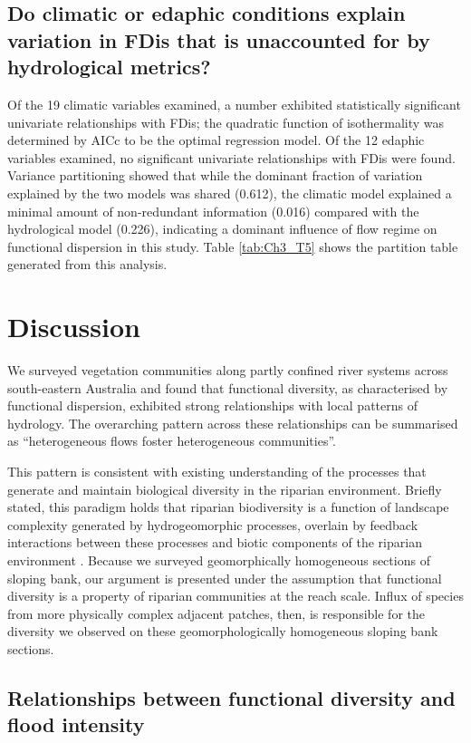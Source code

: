 \documentclass[openright,12pt,a4paper]{memoir}
\begin{document}
\subsection{Do climatic or edaphic conditions explain variation in FDis that is unaccounted for by hydrological metrics?}
Of the 19 climatic variables examined, a number exhibited statistically significant univariate relationships with FDis; the quadratic function of isothermality was determined by AICc to be the optimal regression model. Of the 12 edaphic variables examined, no significant univariate relationships with FDis were found.  Variance partitioning showed that while the dominant fraction of variation explained by the two models was shared (0.612), the climatic model explained a minimal amount of non-redundant information (0.016) compared with the hydrological model (0.226), indicating a dominant influence of flow regime on functional dispersion in this study. Table \ref{tab:Ch3_T5} shows the partition table generated from this analysis.



\section{Discussion}
We surveyed vegetation communities along partly confined river systems across south-eastern Australia and found that functional diversity, as characterised by functional dispersion, exhibited strong relationships with local patterns of hydrology. The overarching pattern across these relationships can be summarised as “heterogeneous flows foster heterogeneous communities”.

This pattern is consistent with existing understanding of the processes that generate and maintain biological diversity in the riparian environment. Briefly stated, this paradigm holds that riparian biodiversity is a function of landscape complexity generated by hydrogeomorphic processes, overlain by feedback interactions between these processes and biotic components of the riparian environment \citep{Tabacchi1998, Palmer1997, Corenblit2007, Bornette2008}. Because we surveyed geomorphically homogeneous sections of sloping bank, our argument is presented under the assumption that functional diversity is a property of riparian communities at the reach scale. Influx of species from more physically complex adjacent patches, then, is responsible for the diversity we observed on these geomorphologically homogeneous sloping bank sections.

\subsection*{Relationships between functional diversity and flood intensity}
\end{document}
